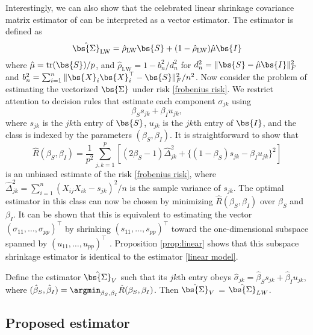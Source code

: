 Interestingly, we can also show that the celebrated linear shrinkage covariance matrix estimator of \citet{ledoit2004well} can be interpreted as a vector estimator. The estimator is defined as
\begin{equation}
\label{linear model}
\hat{\bs{\Sigma}}_{\text{LW}} = \hat{\rho}_{\text{LW}} \bs{S} + (1-\hat{\rho}_{\text{LW}})\hat{\mu} \bs{I}
\end{equation} 
where $\hat{\mu} = \text{tr}(\bs{S})/p$, and $\hat{\rho}_{\text{LW}} = 1 - b_n^2 / d_n^2$ for $d_n^2=\|\bs{S}-\hat{\mu} \bs{I} \|_F^2$ and $b_n^2 = \sum_{i=1}^n \| \bs{X}_i \bs{X}_i^\top - \bs{S} \|_F^2 / n^2$. Now consider the problem of estimating the vectorized $\bs{\Sigma}$ under risk \eqref{frobenius risk}. We restrict attention to decision rules that estimate each component $\sigma_{jk}$ using
\begin{equation}
  \label{linear class}
  \beta_S s_{jk} + \beta_I u_{jk},
\end{equation}
where $s_{jk}$ is the $jk$th entry of $\bs{S}$, $u_{jk}$ is the $jk$th entry of $\bs{I}$, and the class is indexed by the parameters $(\beta_S, \beta_I)$. It is straightforward to show that
$$\hat{R}(\beta_S,\beta_I) = \frac{1}{p^2} \sum_{j,k=1}^{p}[(2\beta_S-1) \hat{\Delta}_{jk}^2 + \{(1- \beta_S) s_{jk} - \beta_I u_{jk}\}^2 ]$$
is an unbiased estimate of the risk \eqref{frobenius risk}, where $\hat{\Delta}_{jk}^2 = \sum_{i=1}^{n}(X_{ij}X_{ik}-s_{jk})^2 / n$ is the sample variance of $s_{jk}$. The optimal estimator in this class can now be chosen by minimizing $\hat{R}(\beta_S, \beta_I)$ over $\beta_S$ and $\beta_I$. It can be shown that this is equivalent to estimating the vector $(\sigma_{11}, \ldots, \sigma_{pp})^\top$ by shrinking $(s_{11}, \ldots, s_{pp})^\top$ toward the one-dimensional subspace spanned by $(u_{11}, \ldots, u_{pp})^\top$ \citep{biscarri2019thesis, lindley1962discussion}. Proposition \ref{prop:linear} shows that this subspace shrinkage estimator is identical to the \citet{ledoit2004well} estimator \eqref{linear model}.
\begin{prop}
  \label{prop:linear}
  Define the estimator $\hat{\bs{\Sigma}}_V$ such that its $jk$th entry obeys $\hat{\sigma}_{jk} = \hat{\beta}_S s_{jk} + \hat{\beta}_I u_{jk}$, where $(\hat{\beta}_S, \hat{\beta}_I) = \argmin_{\beta_S, \beta_I} \hat{R}(\beta_S, \beta_I)$. Then $\hat{\bs{\Sigma}}_V$ = $\hat{\bs{\Sigma}}_{LW}$.
\end{prop}

\subsection{\label{sec:proposed}Proposed estimator}

